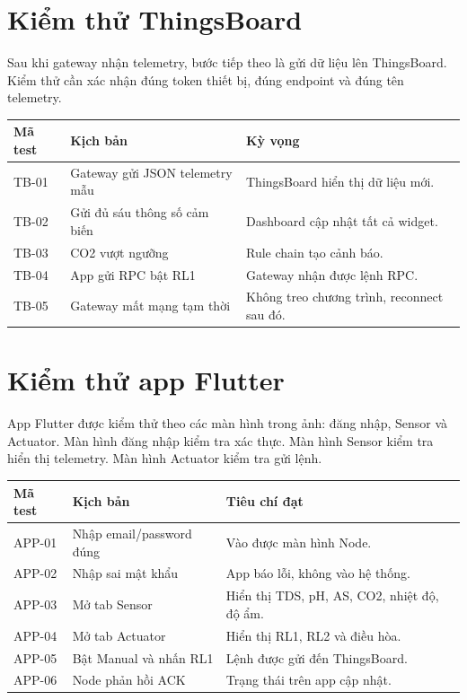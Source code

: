\section{Kiểm thử ThingsBoard}
Sau khi gateway nhận telemetry, bước tiếp theo là gửi dữ liệu lên ThingsBoard. Kiểm thử cần xác nhận đúng token thiết bị, đúng endpoint và đúng tên telemetry.

\begin{longtable}{|p{3cm}|p{4.5cm}|p{5.5cm}|}
\hline
\textbf{Mã test} & \textbf{Kịch bản} & \textbf{Kỳ vọng} \\
\hline
TB-01 & Gateway gửi JSON telemetry mẫu & ThingsBoard hiển thị dữ liệu mới. \\
\hline
TB-02 & Gửi đủ sáu thông số cảm biến & Dashboard cập nhật tất cả widget. \\
\hline
TB-03 & CO2 vượt ngưỡng & Rule chain tạo cảnh báo. \\
\hline
TB-04 & App gửi RPC bật RL1 & Gateway nhận được lệnh RPC. \\
\hline
TB-05 & Gateway mất mạng tạm thời & Không treo chương trình, reconnect sau đó. \\
\hline
\end{longtable}

\section{Kiểm thử app Flutter}
App Flutter được kiểm thử theo các màn hình trong ảnh: đăng nhập, Sensor và Actuator. Màn hình đăng nhập kiểm tra xác thực. Màn hình Sensor kiểm tra hiển thị telemetry. Màn hình Actuator kiểm tra gửi lệnh.

\begin{longtable}{|p{3cm}|p{4.5cm}|p{5.5cm}|}
\hline
\textbf{Mã test} & \textbf{Kịch bản} & \textbf{Tiêu chí đạt} \\
\hline
APP-01 & Nhập email/password đúng & Vào được màn hình Node. \\
\hline
APP-02 & Nhập sai mật khẩu & App báo lỗi, không vào hệ thống. \\
\hline
APP-03 & Mở tab Sensor & Hiển thị TDS, pH, AS, CO2, nhiệt độ, độ ẩm. \\
\hline
APP-04 & Mở tab Actuator & Hiển thị RL1, RL2 và điều hòa. \\
\hline
APP-05 & Bật Manual và nhấn RL1 & Lệnh được gửi đến ThingsBoard. \\
\hline
APP-06 & Node phản hồi ACK & Trạng thái trên app cập nhật. \\
\hline
\end{longtable}

